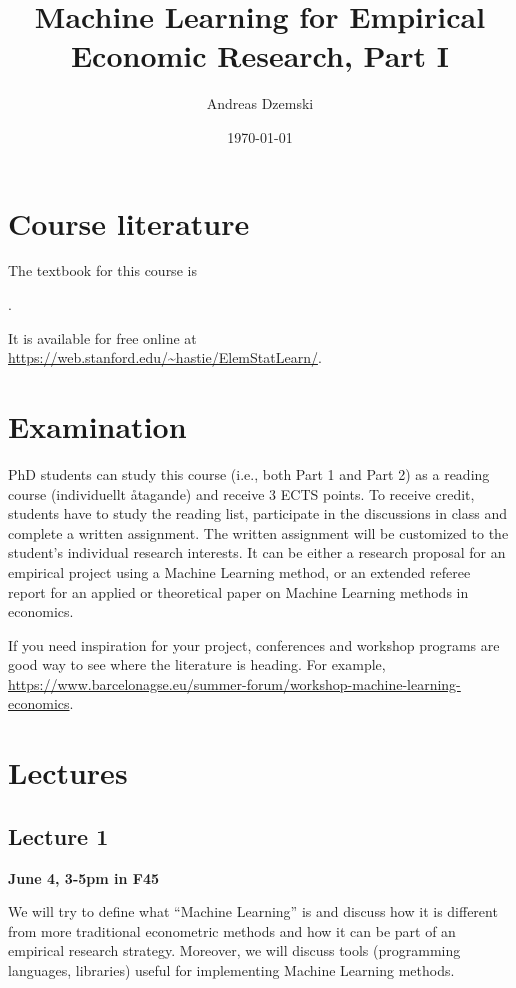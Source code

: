 \documentclass[a4paper]{scrartcl}
\title{Machine Learning for Empirical Economic Research, Part I}
\author{Andreas Dzemski}
\date{\today}
\begin{document}
\maketitle

\section*{Course literature}
The textbook for this course is

\vspace*{6pt}\noindent
{}.

\vspace*{6pt}\noindent
It is available for free online at \url{https://web.stanford.edu/~hastie/ElemStatLearn/}.


\section*{Examination}
PhD students can study this course (i.e., both Part 1 and Part 2) as a reading course (individuellt åtagande) and receive 3 ECTS points. To receive credit, students have to study the reading list, participate in the discussions in class and complete a written assignment. The written assignment will be customized to the student’s individual research interests. It can be either a research proposal for an empirical project using a Machine Learning method, or an extended referee report for an applied or theoretical paper on Machine Learning methods in economics.

If you need inspiration for your project, conferences and workshop programs are good way to see where the literature is heading. For example, \url{https://www.barcelonagse.eu/summer-forum/workshop-machine-learning-economics}.


\section*{Lectures}
\subsection*{Lecture 1}

\textbf{June 4, 3-5pm in F45}

\vspace*{6pt}\noindent
We will try to define what “Machine Learning” is and discuss how it is different from more traditional econometric methods and how it can be part of an empirical research strategy. Moreover, we will discuss tools (programming languages, libraries) useful for implementing Machine Learning methods. 
\end{document}
